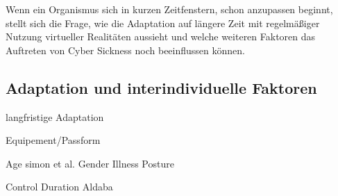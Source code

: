 Wenn ein Organismus sich in kurzen Zeitfenstern, schon anzupassen beginnt, stellt sich die Frage, wie die Adaptation auf l\"angere Zeit mit regelm\"a{\ss}iger Nutzung virtueller Realit\"aten aussieht und welche weiteren Faktoren das Auftreten von Cyber Sickness noch beeinflussen k\"onnen.

\subsection{Adaptation und interindividuelle Faktoren}\label{Adaptation}

langfristige Adaptation

Equipement/Passform

Age simon et al.
Gender 
Illness
Posture

Control
Duration Aldaba 
